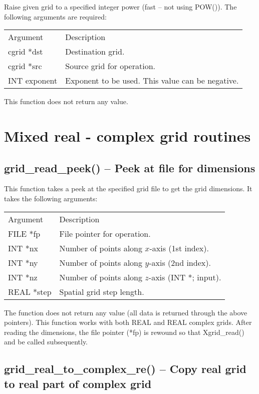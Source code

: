 \documentclass[12pt,letterpaper]{report}
\begin{document}
Raise given grid to a specified integer power (fast -- not using POW()). The following arguments are required:
\begin{longtable}{p{} p{}}
Argument & Description\\
\cline{1-2}
cgrid *dst & Destination grid.\\
cgrid *src & Source grid for operation.\\
INT exponent & Exponent to be used. This value can be negative.\\
\end{longtable}
\noindent
This function does not return any value. 

\section{Mixed real - complex grid routines}

\subsection{grid\_read\_peek() -- Peek at file for dimensions}

This function takes a peek at the specified grid file to get the grid dimensions. It takes the following arguments:
\begin{longtable}{p{} p{}}
Argument & Description\\
\cline{1-2}
FILE *fp & File pointer for operation.\\                                                                                   
INT *nx & Number of points along $x$-axis (1st index).\\
INT *ny & Number of points along $y$-axis (2nd index).\\
INT *nz & Number of points along $z$-axis (INT *; input).\\
REAL *step & Spatial grid step length.\\
\end{longtable}
\noindent
The function does not return any value (all data is returned through the above pointers). This function works with both REAL and REAL complex grids. After reading the dimensions, the file pointer (*fp) is rewound so that Xgrid\_read() and be called subsequently.

\subsection{grid\_real\_to\_complex\_re() -- Copy real grid to real part of complex grid}
\end{document}
